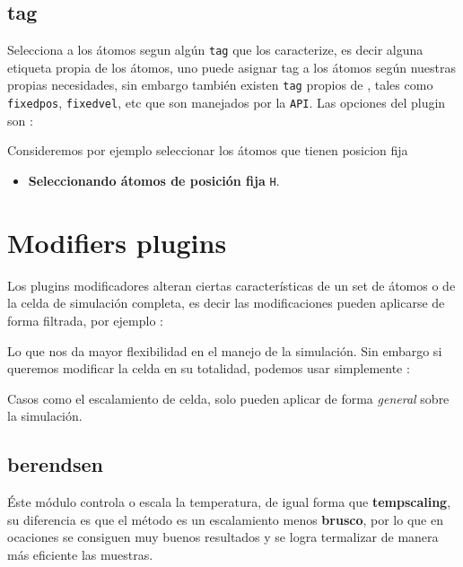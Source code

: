 \subsection{tag}
Selecciona a los \'atomos segun alg\'un \verb|tag| que los caracterize, es decir
alguna etiqueta propia de los \'atomos, uno puede asignar tag a los \'atomos
seg\'un nuestras propias necesidades, sin embargo tambi\'en existen \verb|tag|
propios de {\lpmd}, tales como \verb|fixedpos|, \verb|fixedvel|, etc que son
manejados por la \verb|API|. Las opciones del plugin son :


Consideremos por ejemplo seleccionar los \'atomos que tienen posicion fija

\begin{itemize}
 \item \textbf{Seleccionando \'atomos de posici\'on fija} \texttt{H}.
\end{itemize}

\section{Modifiers plugins}

Los plugins modificadores alteran ciertas caracter\'isticas de un set de
\'atomos o de la celda de simulaci\'on completa, es decir las modificaciones
pueden aplicarse de forma filtrada, por ejemplo :


Lo que nos da mayor flexibilidad en el manejo de la simulaci\'on. Sin embargo si
queremos modificar la celda en su totalidad, podemos usar simplemente :


Casos como el escalamiento de celda, solo pueden aplicar de forma
\textit{general} sobre la simulaci\'on.

\subsection{berendsen}
\'Este m\'odulo controla o escala la temperatura, de igual forma que
\textbf{tempscaling}, su diferencia es que el m\'etodo es un escalamiento menos
\textbf{brusco}, por lo que en ocaciones se consiguen muy buenos resultados y se
logra termalizar de manera m\'as eficiente las muestras. 

